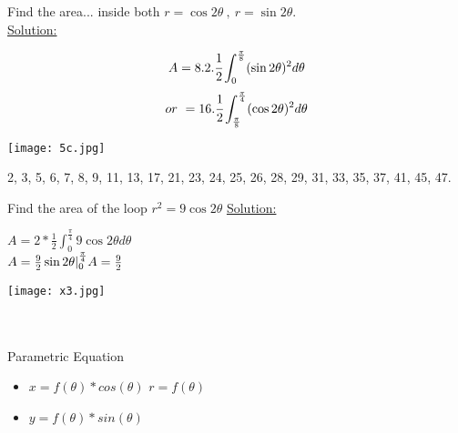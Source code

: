 \noindent{\color{smalt(darkpowderblue)}\rule{\linewidth}{.2mm}}
\begin{example}
Find the area... inside both $r=\cos2\theta~,~r=\sin2\theta.$\\
{\color{smalt(darkpowderblue)} \underline{Solution:}}
\begin{minipage}{0.5\textwidth}
$$A=8.2.\cfrac{1}{2}\int_0^\frac{\pi}{8}(\sin2\theta)^2 d\theta$$
$$or~=16.\cfrac{1}{2}\int_\frac{\pi}{8}^\frac{\pi}{4}(\cos2\theta)^2 d\theta$$
\end{minipage}
\begin{minipage}{0.5\textwidth}
\texttt{[image: 5c.jpg]}
\end{minipage}
\end{example}
\noindent{\color{smalt(darkpowderblue)}\rule{\linewidth}{.2mm}}
\begin{problem}
2, 3, 5, 6, 7, 8, 9, 11, 13, 17, 21, 23, 24, 25, 26, 28, 29, 31, 33, 35, 37, 41, 45, 47.
\end{problem}
\begin{example}
Find the area of the loop $r^2=9\cos 2\theta$ 
{\color{smalt(darkpowderblue)}\underline {Solution:}}\\
\begin{minipage}{0.4\textwidth}
$A=2*\frac{1}{2} \int_{0}^{\frac{\pi}{4}} 9\cos 2\theta d\theta$ \\
$A=\frac{9}{2} \sin 2\theta |_{0}^{\frac{\pi}{4}} \\A= \frac{9}{2}$ \\
\end{minipage}
\begin{minipage}{0.5\textwidth}
\texttt{[image: x3.jpg]}
\end{minipage} \\
\noindent{\color{smalt(darkpowderblue)}\rule{\linewidth}{.2mm}}\\
{\color{smalt(darkpowderblue)}Parametric Equation}
\begin{itemize}
    \item $x=f(\theta) *cos(\theta)$ \hspace{1cm} $r=f(\theta)$
    \item $y=f(\theta) *sin(\theta)$
\end{itemize}
\end{example}
